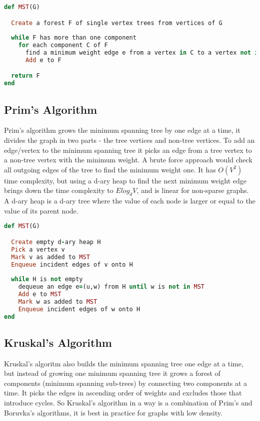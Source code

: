 \documentclass{report}
\theoremstyle{plain}
\theoremstyle{definition}
\theoremstyle{remark}
\begin{document}
\begin{lstlisting}[language=Ruby, mathescape]
def MST(G)

  Create a forest F of single vertex trees from vertices of G
  
  while F has more than one component
    for each component C of F
      find a minimum weight edge e from a vertex in C to a vertex not in C
      Add e to F

  return F
end
\end{lstlisting}

\subsection*{Prim's Algorithm}

Prim's algorithm grows the minimum spanning tree by one edge at a time, it divides the graph in two parts - the tree vertices and non-tree vertices. To add an edge/vertex to the minimum spanning tree it picks an edge from a tree vertex to a non-tree vertex with the minimum weight. A brute force approach would check all outgoing edges of the tree to find the minimum weight one. It has $O(V^2)$ time complexity, but using a d-ary heap to find the next minimum weight edge brings down the time complexity to $Elog_dV$, and is linear for non-sparse graphs. A d-ary heap is a d-ary tree where the value of each node is larger or equal to the value of its parent node.

\begin{lstlisting}[language=Ruby]
def MST(G)

  Create empty d-ary heap H
  Pick a vertex v
  Mark v as added to MST
  Enqueue incident edges of v onto H
  
  while H is not empty
    dequeue an edge e=(u,w) from H until w is not in MST
    Add e to MST
    Mark w as added to MST
    Enqueue incident edges of w onto H
end
\end{lstlisting}

\subsection*{Kruskal's Algorithm}
Kruskal's algoritm also builds the minimum spanning tree one edge at a time, but instead of growing one minimum spanning tree it grows a forest of components (minimum spanning sub-trees) by connecting two components at a time. It picks the edges in ascending order of weights and excludes those that introduce cycles. So Kruskal's algorithm in a way is a combination of Prim's and Boruvka's algorithms, it is best in practice for graphs with low density.
\end{document}
